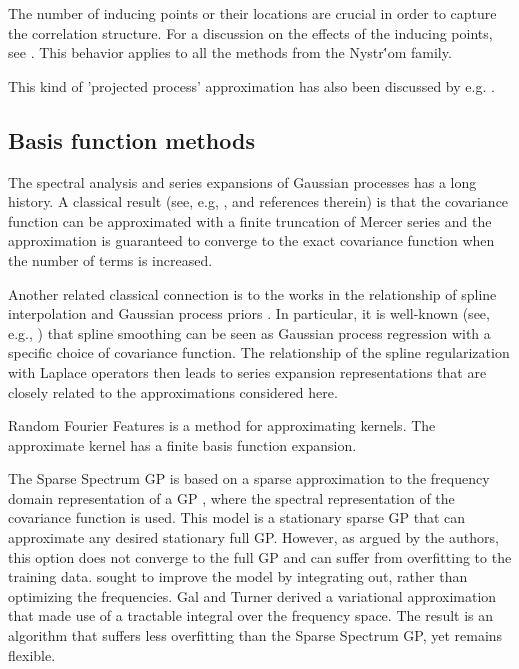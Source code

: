 \documentclass[]{interact}
\theoremstyle{plain}%
\theoremstyle{definition}
\theoremstyle{remark}
\begin{document}
The number of inducing points or their locations are crucial in order to capture the correlation structure. For a discussion on the effects of the inducing points, see \cite{vanhatalo2010approximate}. This behavior applies to all the methods from the Nystr\''om family.

This kind of 'projected process' approximation has also been discussed by e.g. \cite{banerjee2008gaussian}.


\subsection{Basis function methods}

The spectral analysis and series expansions of Gaussian processes has a long history. A classical result (see, e.g, \cite{loeve1977probability,trees1968detection,adler1981geometry,cramer2013stationary}, and references therein) is that the covariance function can be approximated with a finite truncation of Mercer series and the approximation is guaranteed to converge to the exact covariance function when the number of terms is increased. 

Another related classical connection is to the works in the relationship of spline interpolation and Gaussian process priors \citep{wahba1978improper,kimeldorf1970correspondence,wahba1990spline}. In particular, it is well-known (see, e.g., \cite{wahba1990spline}) that spline smoothing can be seen as Gaussian process regression with a specific choice of covariance function. The relationship of the spline regularization with Laplace operators then leads to series expansion representations that are closely related to the approximations considered here. 

Random Fourier Features \citep{rahimi2008random,rahimi2009weighted} is a method for approximating kernels. The approximate kernel has a finite basis function expansion.


The Sparse Spectrum GP is based on a sparse approximation to the frequency domain representation of a GP \citep{lazaro2010sparse,quia2010sparse}, where the spectral representation of the covariance function is used. This model is a stationary sparse GP that can approximate any desired stationary full GP. However, as argued by the authors, this option does not converge to the full GP and can suffer from overfitting to the training data. \citep{gal2015improving} sought to improve the model by integrating out, rather than optimizing the frequencies. Gal and Turner derived a variational approximation that made use of a tractable integral over the frequency space. The result is an  algorithm that suffers less overfitting than the Sparse Spectrum GP, yet remains flexible.
\end{document}
